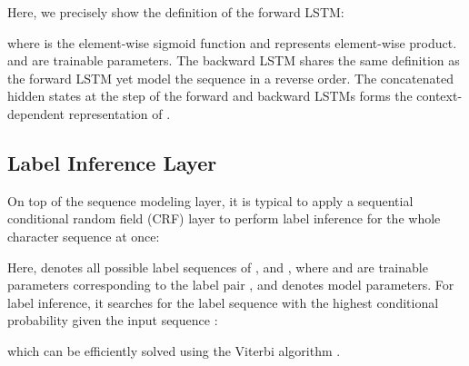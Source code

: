 \documentclass[11pt,a4paper]{article}
\begin{document}
\begin{CJK}{UTF8}{gbsn}
Here, we precisely show the definition of the forward LSTM:

where  is the element-wise sigmoid function and  represents element-wise product.  and  are trainable parameters. The backward LSTM shares the same definition as the forward LSTM yet model the sequence in a reverse order. 
The concatenated hidden states at the  step of the forward and backward LSTMs  forms the context-dependent representation of .
 

\subsection{Label Inference Layer}
On top of the sequence modeling layer, it is typical to apply a sequential conditional random field (CRF) \cite{lafferty2001conditional} layer to perform label inference for the whole character sequence at once:

Here,  denotes all possible label sequences of , and , where  and  are trainable parameters corresponding to the label pair , and  denotes model parameters. 
For label inference, it searches for the label sequence  with the highest conditional probability given the input sequence :

which can be efficiently solved using the Viterbi algorithm \cite{forney1973viterbi}. 


\begin{table}[t]
\centering
{}
\caption{Statistics of datasets.}
  \label{tab:data_statistic}
\end{table}


\end{CJK}
\end{document}
